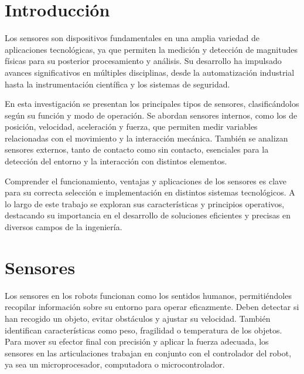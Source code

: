 
\section{Introducción}
Los sensores son dispositivos fundamentales en una amplia variedad de aplicaciones tecnológicas, ya que permiten la medición y detección de magnitudes físicas para su posterior procesamiento y análisis. Su desarrollo ha impulsado avances significativos en múltiples disciplinas, desde la automatización industrial hasta la instrumentación científica y los sistemas de seguridad.

En esta investigación se presentan los principales tipos de sensores, clasificándolos según su función y modo de operación. Se abordan sensores internos, como los de posición, velocidad, aceleración y fuerza, que permiten medir variables relacionadas con el movimiento y la interacción mecánica. También se analizan sensores externos, tanto de contacto como sin contacto, esenciales para la detección del entorno y la interacción con distintos elementos.

Comprender el funcionamiento, ventajas y aplicaciones de los sensores es clave para su correcta selección e implementación en distintos sistemas tecnológicos. A lo largo de este trabajo se exploran sus características y principios operativos, destacando su importancia en el desarrollo de soluciones eficientes y precisas en diversos campos de la ingeniería.

\section{Sensores}
Los sensores en los robots funcionan como los sentidos humanos, permitiéndoles recopilar información sobre su entorno para operar eficazmente. Deben detectar si han recogido un objeto, evitar obstáculos y ajustar su velocidad. También identifican características como peso, fragilidad o temperatura de los objetos. Para mover su efector final con precisión y aplicar la fuerza adecuada, los sensores en las articulaciones trabajan en conjunto con el controlador del robot, ya sea un microprocesador, computadora o microcontrolador.